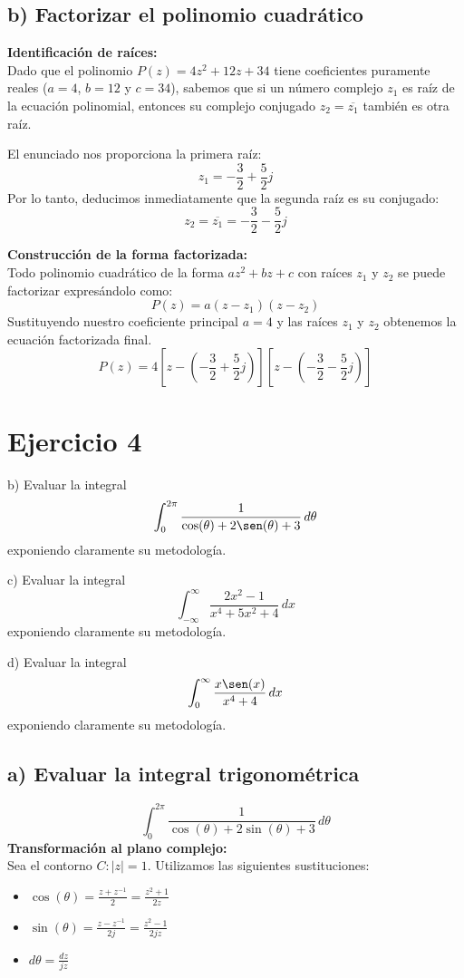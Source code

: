 \documentclass[a4paper, 12pt]{article}
\begin{document}
\subsection{b) Factorizar el polinomio cuadrático}
\textbf{Identificación de raíces:} \\
Dado que el polinomio $P(z) = 4z^2 + 12z + 34$ tiene coeficientes puramente
reales ($a=4$, $b=12$ y $c=34$), sabemos
que si un número complejo $z_1$ es raíz de la ecuación polinomial, entonces
su complejo conjugado $z_2 = \overline{z_1}$ también es otra raíz.

El enunciado nos proporciona la primera raíz:
\[
z_1 = -\frac{3}{2} + \frac{5}{2}j
\]
Por lo tanto, deducimos inmediatamente que la segunda raíz es su conjugado:
\[
z_2 = \overline{z_1} = -\frac{3}{2} - \frac{5}{2}j
\]

\textbf{Construcción de la forma factorizada:} \\
Todo polinomio cuadrático de la forma $az^2 + bz + c$ con raíces $z_1$ y $z_2$ se puede factorizar expresándolo como:
\[
P(z) = a(z - z_1)(z - z_2)
\]
Sustituyendo nuestro coeficiente principal $a = 4$ y las raíces $z_1$ y $z_2$ obtenemos la ecuación factorizada final.
\begin{equation*}
\boxed{P(z)=4 \left[ z - \left(-\frac{3}{2} + \frac{5}{2}j\right) \right] \left[ z - \left(-\frac{3}
{2} - \frac{5}{2}j\right) \right] }
\end{equation*}

\newpage
\section{Ejercicio 4}
b) Evaluar la integral
\[
\int_{0}^{2\pi} \frac{1}{\cos(\theta) + 2\sen(\theta) + 3} \, d\theta
\]
exponiendo claramente su metodología.

\vspace{0.4cm}

c) Evaluar la integral
\[
\int_{-\infty}^{\infty} \frac{2x^2 - 1}{x^4 + 5x^2 + 4} \, dx
\]
exponiendo claramente su metodología.
\vspace{0.4cm}

d) Evaluar la integral
\[
\int_{0}^{\infty} \frac{x \sen(x)}{x^4 + 4} \, dx
\]
exponiendo claramente su metodología.
\subsection{a) Evaluar la integral trigonométrica
}
\[\int_{0}^{2\pi} \frac{1}{\cos(\theta) + 2\sin(\theta) + 3} \, d\theta\]
\textbf{Transformación al plano complejo:} \\
Sea el contorno $C: |z|=1$. Utilizamos las siguientes sustituciones:
\begin{itemize}
    \item $\cos(\theta) = \frac{z + z^{-1}}{2} = \frac{z^2+1}{2z}$
    \item $\sin(\theta) = \frac{z - z^{-1}}{2j} = \frac{z^2-1}{2jz}$
    \item $d\theta = \frac{dz}{jz}$
\end{itemize}
\end{document}
